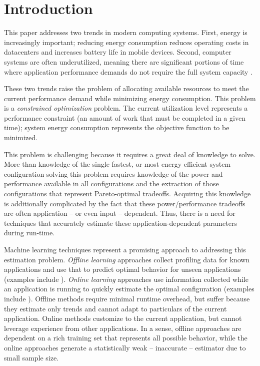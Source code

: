 
\section{Introduction}

This paper addresses two trends in modern computing systems.  First,
energy is increasingly important; reducing energy consumption reduces
operating costs in datacenters and increases battery life in mobile
devices.  Second, computer systems are often underutilized, meaning
there are significant portions of time where application performance
demands do not require the full system capacity
\cite{google2007,MeisnerISCA2011}.

These two trends raise the problem of allocating available resources
to meet the current performance demand while minimizing energy
consumption. This problem is a \emph{constrained optimization}
problem. The current utilization level represents a performance
constraint (\ie an amount of work that must be completed in a given
time); system energy consumption represents the objective function to
be minimized.

This problem is challenging because it requires a great deal of
knowledge to solve.  More than knowledge of the single fastest, or
most energy efficient system configuration solving this problem
requires knowledge of the power and performance available in all
configurations and the extraction of those configurations that
represent Pareto-optimal tradeoffs.  Acquiring this knowledge is
additionally complicated by the fact that these power/performance
tradeoffs are often application -- or even input -- dependent.  Thus,
there is a need for techniques that accurately estimate these
application-dependent parameters during run-time.

Machine learning techniques represent a promising approach to
addressing this estimation problem.  \emph{Offline learning}
approaches collect profiling data for known applications and use that
to predict optimal behavior for unseen applications (examples include
\cite{Yi2003,Koala,LeeBrooks2006,CPR,ChenJohn2011}).  \emph{Online
  learning} approaches use information collected while an application
is running to quickly estimate the optimal configuration (examples
include
\cite{Li2006,Flicker,ParallelismDial,Ponamarev,petabricksDynamic,LeeBrooks,TAAS}).
Offline methods require minimal runtime overhead, but suffer because
they estimate only trends and cannot adapt to particulars of the
current application.  Online methods customize to the current
application, but cannot leverage experience from other applications.
In a sense, offline approaches are dependent on a rich training set
that represents all possible behavior, while the online approaches
generate a statistically weak -- \ie inaccurate -- estimator due to
small sample size.

